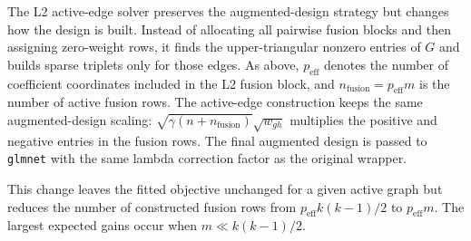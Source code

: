 \documentclass[twoside,11pt]{article}
\begin{document}
The L2 active-edge solver preserves the augmented-design strategy but changes
how the design is built. Instead of allocating all pairwise fusion blocks and
then assigning zero-weight rows, it finds the upper-triangular nonzero entries
of $G$ and builds sparse triplets only for those edges. As above,
$p_{\mathrm{eff}}$ denotes the number of coefficient coordinates included in
the L2 fusion block, and $n_{\mathrm{fusion}}=p_{\mathrm{eff}}m$ is the number
of active fusion rows. The active-edge construction keeps the same
augmented-design scaling: $\sqrt{\gamma(n+n_{\mathrm{fusion}})}\sqrt{w_{gh}}$
multiplies the positive and negative entries in the fusion rows. The final
augmented design is passed to \texttt{glmnet} \citep{glmnet} with the same
lambda correction factor as the original wrapper.

This change leaves the fitted objective unchanged for a given active graph but
reduces the number of constructed fusion rows from
$p_{\mathrm{eff}} k(k-1)/2$ to $p_{\mathrm{eff}}m$. The largest expected gains
occur when $m \ll k(k-1)/2$.
\end{document}
